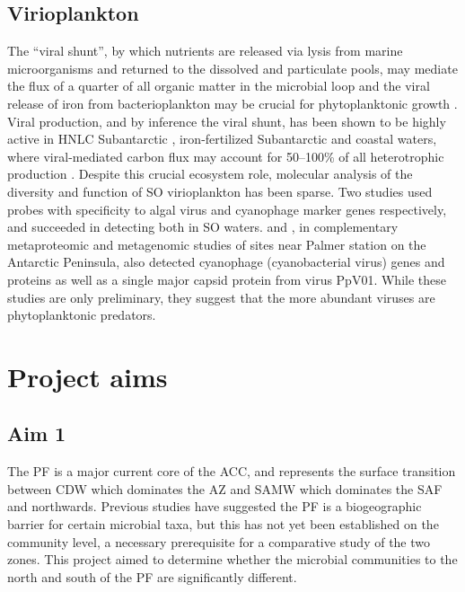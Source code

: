 \subsection{Virioplankton}

The ``viral shunt'', by which nutrients are released via lysis from marine microorganisms and returned to the dissolved and particulate pools, may mediate the flux of a quarter of all organic matter in the microbial loop \cite{Wilhelm:1999ds} and the viral release of iron from bacterioplankton may be crucial for phytoplanktonic growth \cite{Poorvin:2004vo}.
Viral production, and by inference the viral shunt, has been shown to be highly active in \ac{HNLC} Subantarctic \cite{Evans:2009ex}, iron-fertilized Subantarctic \cite{Weinbauer:2009tl} and coastal waters, where viral-mediated carbon flux may account for 50--100\% of all heterotrophic production \cite{GuixaBoixereu:2002vh}.
Despite this crucial ecosystem role, molecular analysis of the diversity and function of \ac{SO} virioplankton has been sparse.
Two studies \cite{Short:2002kk,Short:2005df} used probes with specificity to algal virus and cyanophage marker genes respectively, and succeeded in detecting both in \ac{SO} waters.
\citet{Williams:2012bs} and \citet{Grzymski:2012ej}, in complementary metaproteomic and metagenomic studies of sites near Palmer station on the Antarctic Peninsula, also detected cyanophage (cyanobacterial virus) genes and proteins as well as a single major capsid protein from  virus PpV01.
While these studies are only preliminary, they suggest that the more abundant viruses are phytoplanktonic predators.

\section{Project aims}

\subsection{Aim 1}

The \ac{PF} is a major current core of the \ac{ACC}, and represents the surface transition between \ac{CDW} which dominates the \ac{AZ} and \ac{SAMW} which dominates the \ac{SAF} and northwards.
Previous studies \citep[e.g.][]{Abell:2005ji,Giebel:2009hr,Selje:2004ka} have suggested the \ac{PF} is a biogeographic barrier for certain microbial taxa, but this has not yet been established on the community level, a necessary prerequisite for a comparative study of the two zones.
This project aimed to determine whether the microbial communities to the north and south of the \ac{PF} are significantly different.

